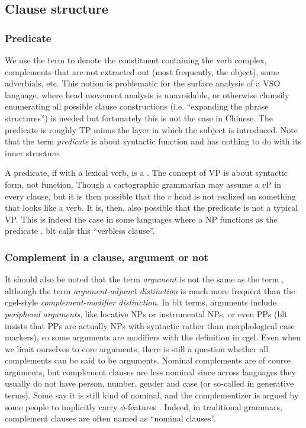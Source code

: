 \documentclass[../main.tex]{subfiles}
\begin{document}
\subsection{Clause structure}

\subsubsection{Predicate}

We use the term  to denote the constituent containing the verb complex, 
complements that are not extracted out (most frequently, the object), some adverbials, etc.
This notion is problematic for the surface analysis of a VSO language, 
where head movement analysis is unavoidable, 
or otherwise clumsily enumerating all possible clause constructions 
(i.e. ``expanding the phrase structures'') is needed
but fortunately this is not the case in Chinese. 
The predicate is roughly TP minus the layer in which the subject is introduced. 
Note that the term \emph{predicate} is about syntactic function 
and has nothing to do with its inner structure.

A predicate, if with a lexical verb, is a .
The concept of VP is about syntactic form, not function. 
Though a cartographic grammarian may assume a $v$P in every clause, 
but it is then possible that the $v$ head is not realized on something that looks like a verb. 
It is, then, also possible that the predicate is not a typical VP.
This is indeed the case in some languages where a NP functions as the predicate \citep[Section 10.1.2]{Friesen2017}.
\ac{blt} calls this ``verbless clause''.

\subsubsection{Complement in a clause, argument or not}

It should also be noted that the term \emph{argument} is not the same as the term , 
although the term \emph{argument-adjunct distinction} 
is much more frequent than the \ac{cgel}-style \emph{complement-modifier distinction}. 
In \ac{blt} terms, arguments include \emph{peripheral arguments},
like locative NPs or instrumental NPs, or even PPs 
(\ac{blt} insists that PPs are actually NPs with syntactic rather than morphological case markers), 
so some arguments are modifiers with the definition in \ac{cgel}. 
Even when we limit ourselves to core arguments, 
there is still a question whether all complements can be said to be arguments. 
Nominal complements are of course arguments, 
but complement clauses are less nominal 
since across languages they usually do not have person, number, gender and case 
(or so-called  in generative terms). 
Some say it is still kind of nominal, 
and the complementizer is argued by some people to implicitly carry $\phi$-features \citep{complement-clause}.
Indeed, in traditional grammars, complement clauses are often named as ``nominal clauses''.
\end{document}
